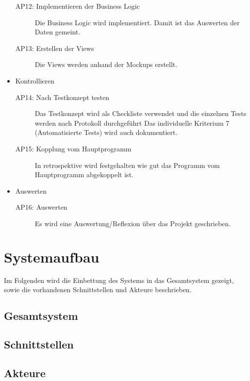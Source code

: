 \begin{itemize}
\begin{description}
        \item[AP12: Implementieren der \gls{Business Logic}] Die Business Logic wird implementiert. Damit ist das Auswerten der Daten gemeint.
        \item[AP13: Erstellen der \gls{Views}] Die Views werden anhand der \gls{Mockups} erstellt.
    \end{description}
    \item Kontrollieren
    \begin{description}
        \item[AP14: Nach Testkonzept testen] Das Testkonzept wird als Checkliste verwendet und die einzelnen Tests werden nach Protokoll durchgeführt \newline
        Das individuelle Kriterium 7 (Automatisierte Tests) wird auch dokumentiert.
        \item[AP15: Kopplung vom Hauptprogramm] In retrospektive wird festgehalten wie gut das Programm vom Hauptprogramm abgekoppelt ist.
    \end{description}
    \item Auswerten
    \begin{description}
        \item[AP16: Auswerten] Es wird eine Auswertung/Reflexion über das Projekt geschrieben.
    \end{description}
\end{itemize}

\section{Systemaufbau}
Im Folgenden wird die Einbettung des Systems in das Gesamtsystem gezeigt, sowie die vorhandenen Schnittstellen und Akteure beschrieben.

\subsection{Gesamtsystem}

\subsection{Schnittstellen}

\subsection{Akteure}
